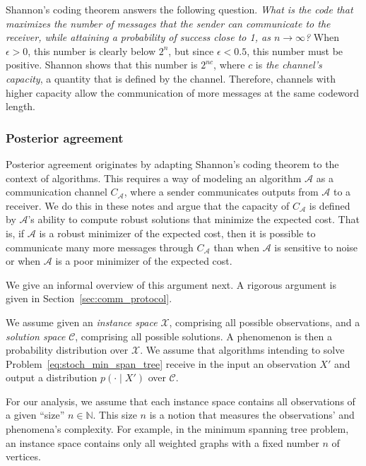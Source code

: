 Shannon's coding theorem answers the following question. \emph{What is the code that maximizes the number of messages that the sender can communicate to the receiver, while attaining a probability of success close to 1, as $n \to \infty$?} When $\epsilon > 0$, this number is clearly below $2^n$, but since $\epsilon < 0.5$, this number must be positive. Shannon shows that this number is $2^{nc}$, where $c$ is \emph{the channel's capacity}, a quantity that is defined by the channel. Therefore, channels with higher capacity allow the communication of more messages at the same codeword length.

\subsubsection*{Posterior agreement}

Posterior agreement originates by adapting Shannon's coding theorem to the context of algorithms. This requires a way of modeling an algorithm $\mathcal{A}$ as a communication channel $C_{\mathcal{A}}$, where a sender communicates outputs from $\mathcal{A}$ to a receiver. We do this in these notes and argue that the capacity of $C_{\mathcal{A}}$ is defined by $\mathcal{A}$'s ability to compute robust solutions that minimize the expected cost. That is, if $\mathcal{A}$ is a robust minimizer of the expected cost, then it is possible to communicate many more messages through $C_{\mathcal{A}}$ than when $\mathcal{A}$ is sensitive to noise or when $\mathcal{A}$ is a poor minimizer of the expected cost.

We give an informal overview of this argument next. A rigorous argument is given in Section~\ref{sec:comm_protocol}.

We assume given an \emph{instance space} $\mathcal{X}$, comprising all possible observations, and a \emph{solution space} $\mathcal{C}$, comprising all possible solutions. A phenomenon is then a probability distribution over $\mathcal{X}$. We assume that algorithms intending to solve Problem~\ref{eq:stoch_min_span_tree} receive in the input an observation $X'$ and output a distribution $p(\cdot \mid X')$ over $\mathcal{C}$.

For our analysis, we assume that each instance space contains all observations of a given ``size'' $n \in \mathbb{N}$. This size $n$ is a notion that measures the observations' and phenomena's complexity. For example, in the minimum spanning tree problem, an instance space contains only all weighted graphs with a fixed number $n$ of vertices.

